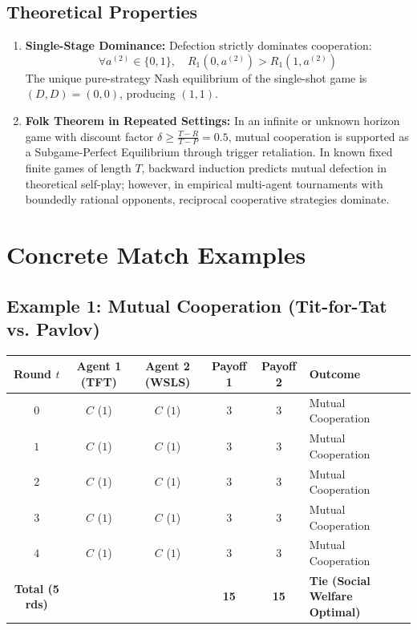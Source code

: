 ﻿\documentclass[11pt,a4paper]{article}
\begin{document}
\subsection{Theoretical Properties}
\begin{enumerate}
    \item \textbf{Single-Stage Dominance:} Defection strictly dominates cooperation:
    \[
    \forall a^{(2)} \in \{0, 1\}, \quad R_1(0, a^{(2)}) > R_1(1, a^{(2)})
    \]
    The unique pure-strategy Nash equilibrium of the single-shot game is $(D, D) = (0, 0)$, producing $(1, 1)$.
    \item \textbf{Folk Theorem in Repeated Settings:} In an infinite or unknown horizon game with discount factor $\delta \ge \frac{T - R}{T - P} = 0.5$, mutual cooperation is supported as a Subgame-Perfect Equilibrium through trigger retaliation. In known fixed finite games of length $T$, backward induction predicts mutual defection in theoretical self-play; however, in empirical multi-agent tournaments with boundedly rational opponents, reciprocal cooperative strategies dominate.
\end{enumerate}


\section{Concrete Match Examples}

\subsection{Example 1: Mutual Cooperation (Tit-for-Tat vs. Pavlov)}
\begin{center}
\small
\begin{tabularx}{\textwidth}{cccccX}
\toprule
\textbf{Round} $t$ & \textbf{Agent 1 (TFT)} & \textbf{Agent 2 (WSLS)} & \textbf{Payoff 1} & \textbf{Payoff 2} & \textbf{Outcome} \\
\midrule
$0$ & $C$ ($1$) & $C$ ($1$) & $3$ & $3$ & Mutual Cooperation \\
$1$ & $C$ ($1$) & $C$ ($1$) & $3$ & $3$ & Mutual Cooperation \\
$2$ & $C$ ($1$) & $C$ ($1$) & $3$ & $3$ & Mutual Cooperation \\
$3$ & $C$ ($1$) & $C$ ($1$) & $3$ & $3$ & Mutual Cooperation \\
$4$ & $C$ ($1$) & $C$ ($1$) & $3$ & $3$ & Mutual Cooperation \\
\midrule
\textbf{Total (5 rds)} & & & \textbf{15} & \textbf{15} & \textbf{Tie (Social Welfare Optimal)} \\
\bottomrule
\end{tabularx}
\end{center}
\end{document}

